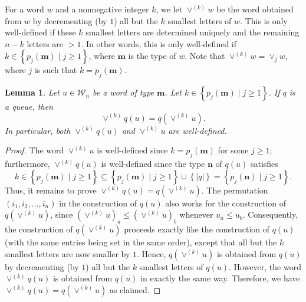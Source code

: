 \documentclass[reqno]{amsart}
\newcommand{\0}{\phantom{c}}
\newcommand{\merge}[1]{\vee_{#1}} %
\newcommand{\mm}{\mathbf{m}}
\newcommand{\nn}{\mathbf{n}}
\newcommand{\mcW}{\mathcal{W}}
\newcommand{\set}[1]{\left\{ #1 \right\}}
\newcommand{\abs}[1]{\left| #1 \right|}
\newcommand{\tup}[1]{\left( #1 \right)}
\newcommand{\defn}[1]{{\color{darkred}\emph{#1}}} %
\theoremstyle{plain}
\newtheorem{lemma}[thm]{Lemma}
\theoremstyle{definition}
\numberwithin{equation}{section}
\newcommand{\Travis}[1]{\todo[size=\tiny,inline,color=blue!30]{#1
      \\ \hfill --- Travis}}
\begin{document}
For a word $w$ and a nonnegative integer $k$, we let \defn{$\vee^{(k)} w$} be the word obtained from $w$ by decrementing (by $1$) all but the $k$ smallest letters of $w$.
This is only well-defined if these $k$ smallest letters are determined uniquely and the remaining $n-k$ letters are $> 1$.
In other words, this is only well-defined if $k \in \set{ p_j(\mm) \mid j \geq 1 }$, where $\mm$ is the type of $w$.
Note that $\vee^{(k)} w = \merge{j} w$, where $j$ is such that $k = p_j(\mm)$.


\begin{lemma}
\label{lemma:queue_merge_commute}
Let $u \in \mcW_n$ be a word of type $\mm$.
Let $k \in \set{ p_j(\mm) \mid j \geq 1 }$.
If $q$ is a queue, then
\[
\vee^{(k)} q(u) = q(\vee^{(k)} u).
\]
In particular, both $\vee^{(k)} q(u)$ and $\vee^{(k)} u$ are well-defined.
\end{lemma}

\begin{proof}
The word $\vee^{(k)} u$ is well-defined since $k = p_j(\mm)$ for some $j \geq 1$;
furthermore, $\vee^{(k)} q(u)$ is well-defined since the type $\nn$ of $q(u)$
satisfies
\[
k \in \set{ p_j(\mm) \mid j \geq 1 } \subseteq \set{ p_j(\mm) \mid j \geq 1 } \cup \set{\abs{q}} = \set{ p_j(\nn) \mid j \geq 1 }.
\]
Thus, it remains to prove $\vee^{(k)} q(u) = q(\vee^{(k)} u)$.
The permutation $\tup{i_1, i_2, \dotsc, i_n}$ in the construction of $q(u)$
also works for the construction of $q(\vee^{(k)} u)$,
since $(\vee^{(k)} u)_a \leq (\vee^{(k)} u)_b$ whenever $u_a \leq u_b$.
Consequently, the construction of $q(\vee^{(k)} u)$ proceeds exactly like
the construction of $q(u)$ (with the same entries being set in the same
order), except that all but the $k$ smallest letters are now smaller by $1$.
Hence, $q(\vee^{(k)} u)$ is obtained from $q(u)$ by decrementing (by $1$)
all but the $k$ smallest letters of $q(u)$.
However, the word $\vee^{(k)} q(u)$ is obtained from $q(u)$ in exactly the same way.
Therefore, we have $\vee^{(k)} q(u) = q(\vee^{(k)} u)$ as claimed.
\end{proof}
\end{document}
